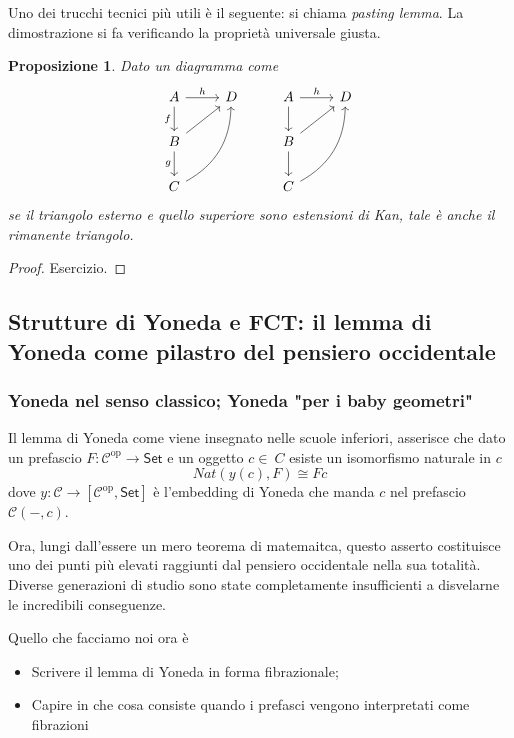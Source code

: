 \documentclass[11pt]{article}
\def\C{\mathcal{C}}
\def\Set{\mathsf{Set}}
\def\opp{\mathrm{op}}
\theoremstyle{reference}
\newtheorem{proposition}[theorem]{Proposizione}
\begin{document}
Uno dei trucchi tecnici più utili è il seguente: si chiama
\emph{pasting lemma}. La dimostrazione si fa verificando la
proprietà universale giusta.
\begin{proposition}
Dato un diagramma come
$$
\begin{tikzcd}
|[alias=a]|A \ar[r,"h"]\ar[d,"f"']&|[alias=d]| D &|[alias=a']| A \ar[d]\ar[r,"h"]&|[alias=d']| D \\
B \ar[d,"g"']\ar[ur]&&|[alias=b']| B \ar[d]\ar[ur]\\
|[alias=c]|C \ar[bend right,uur] && C\ar[bend right,uur] 
\end{tikzcd}
$$
se il triangolo esterno e quello superiore sono estensioni di Kan, tale è anche il rimanente triangolo.
\end{proposition}
\begin{proof}
  Esercizio.
\end{proof}
\subsection{Strutture di Yoneda e FCT: il lemma di Yoneda come pilastro del pensiero occidentale}
\label{sec:org55a4f6d}

\subsubsection{Yoneda nel senso classico; Yoneda "per i baby geometri"}
\label{sec:org8062c05}

Il lemma di Yoneda come viene insegnato nelle scuole
inferiori, asserisce che dato un prefascio \(F : \C^\opp \to
\Set\) e un oggetto \(c\in\ C\) esiste un isomorfismo naturale
in \(c\) $$ Nat(y(c), F)\cong Fc $$ dove \(y : \C \to
[\C^\opp,\Set]\) è l'embedding di Yoneda che manda \(c\) nel
prefascio \(\C(-,c)\).

Ora, lungi dall’essere un mero teorema di matemaitca, questo
asserto costituisce uno dei punti più elevati raggiunti dal
pensiero occidentale nella sua totalità. Diverse generazioni
di studio sono state completamente insufficienti a
disvelarne le incredibili conseguenze.

Quello che facciamo noi ora è

\begin{itemize}
\item Scrivere il lemma di Yoneda in forma fibrazionale;
\item Capire in che cosa consiste quando i prefasci vengono
interpretati come fibrazioni
\end{itemize}
\end{document}

